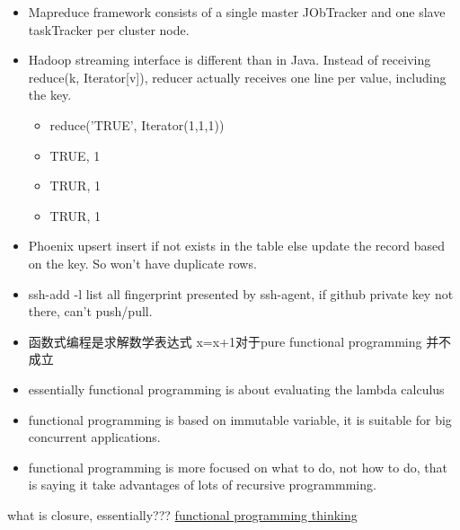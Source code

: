 \documentclass[a4paper]{tufte-handout}
\begin{document}
\begin{note}
  \begin{itemize}
  \item Mapreduce framework consists of a single master JObTracker and one slave taskTracker per cluster node.
  \item Hadoop streaming interface is different than in Java. Instead of receiving reduce(k, Iterator[v]), reducer actually receives one line per value, including the key.
    \begin{itemize}
    \item reduce('TRUE', Iterator(1,1,1))
    \item  TRUE, 1
    \item TRUR, 1
    \item TRUR, 1
    \end{itemize}
   \item Phoenix upsert insert if not exists in the table else update the record based on the key. So won't have duplicate rows.
  \end{itemize}
\end{note}

\begin{note}
  \begin{itemize}
    \item ssh-add -l list all fingerprint presented by ssh-agent, if github private key not there, can't push/pull.
    \end{itemize}
\end{note}

\begin{note}
  \begin{itemize}
  \item 函数式编程是求解数学表达式 x=x+1对于pure functional programming 并不成立
  \item essentially functional programming is about evaluating the lambda calculus
  \item functional programming is based on immutable variable, it is suitable for big concurrent applications.
  \item functional programming is more focused on what to do, not how to do, that is saying it take advantages of lots of recursive programmming.
    
    \end{itemize}
\end{note}
what is closure, essentially???
\href{https://www.ibm.com/developerworks/cn/java/j-lo-funinscala1/}{functional programming thinking}



\end{document}
